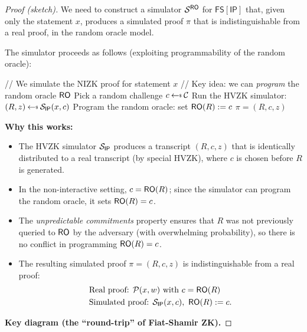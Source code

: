 \documentclass[11pt]{article}
\begin{document}
\begin{proof}[Proof (sketch)]
We need to construct a simulator $\mathcal{S}^{\mathsf{RO}}$ for
$\mathsf{FS[IP]}$ that, given only the statement $x$, produces a
simulated proof $\pi$ that is indistinguishable from a real proof, in
the random oracle model.

The simulator proceeds as follows (exploiting programmability of the
random oracle):

\begin{algorithm}[H]
\caption{NIZK Simulator $\Sim^{\RO}(x)$}
\begin{algorithmic}[1]
  \State // We simulate the NIZK proof for statement $x$
  \State // Key idea: we can \emph{program} the random oracle $\mathsf{RO}$
  \State Pick a random challenge $c \getsr \calC$
  \State Run the HVZK simulator: $(R, z) \getsr \Sim_{\mathsf{IP}}(x, c)$
  \State Program the random oracle: set $\mathsf{RO}(R) := c$
  \State \Return $\pi = (R, c, z)$
\end{algorithmic}
\end{algorithm}

\noindent\textbf{Why this works:}
\begin{itemize}
  \item The HVZK simulator $\mathcal{S}_{\mathsf{IP}}$ produces a
        transcript $(R, c, z)$ that is identically distributed to a
        real transcript (by special HVZK), where $c$ is chosen before
        $R$ is generated.
  \item In the non-interactive setting, $c = \mathsf{RO}(R)$; since the
        simulator can program the random oracle, it sets
        $\mathsf{RO}(R) = c$.
  \item The \emph{unpredictable commitments} property ensures that $R$
        was not previously queried to $\mathsf{RO}$ by the adversary
        (with overwhelming probability), so there is no conflict in
        programming $\mathsf{RO}(R) = c$.
  \item The resulting simulated proof $\pi = (R, c, z)$ is
        indistinguishable from a real proof:
        \begin{align*}
          &\text{Real proof: } \mathcal{P}(x, w) \text{ with } c = \mathsf{RO}(R) \\
          &\text{Simulated proof: } \mathcal{S}_{\mathsf{IP}}(x, c),\
            \mathsf{RO}(R) := c.
        \end{align*}
\end{itemize}

\medskip
\noindent\textbf{Key diagram (the ``round-trip'' of Fiat-Shamir ZK).}


\end{proof}
\end{document}
